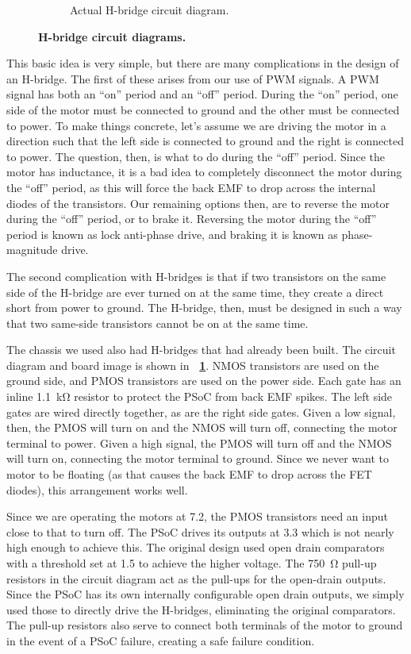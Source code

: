 \documentclass[letterpaper, 11pt]{article}
\newcommand*{\figref}[1]{\textbf{\figurename~\ref{#1}}}
\begin{document}
\begin{enumerate}[label=\textbf{\arabic*.}]
\begin{figure}[ht]
\begin{subfigure}[t]{0.66\textwidth}
        \caption{Actual H-bridge circuit diagram.}
        \label{fig:hb-circuit}
    \end{subfigure}
    \caption{\textbf{H-bridge circuit diagrams.}}
    \label{fig:hbridge}
\end{figure}

This basic idea is very simple, but there are many complications in the design of an H-bridge. The first of these arises from our use of PWM signals. A PWM signal has both an ``on'' period and an ``off'' period. During the ``on'' period, one side of the motor must be connected to ground and the other must be connected to power. To make things concrete, let's assume we are driving the motor in a direction such that the left side is connected to ground and the right is connected to power. The question, then, is what to do during the ``off'' period. Since the motor has inductance, it is a bad idea to completely disconnect the motor during the ``off'' period, as this will force the back EMF to drop across the internal diodes of the transistors. Our remaining options then, are to reverse the motor during the ``off'' period, or to brake it. Reversing the motor during the ``off'' period is known as lock anti-phase drive, and braking it is known as phase-magnitude drive.

The second complication with H-bridges is that if two transistors on the same side of the H-bridge are ever turned on at the same time, they create a direct short from power to ground. The H-bridge, then, must be designed in such a way that two same-side transistors cannot be on at the same time.

The chassis we used also had H-bridges that had already been built. The circuit diagram and board image is shown in \figref{fig:hb-circuit}. NMOS transistors are used on the ground side, and PMOS transistors are used on the power side. Each gate has an inline \SI{1.1}{\kilo\ohm} resistor to protect the PSoC from back EMF spikes. The left side gates are wired directly together, as are the right side gates. Given a low signal, then, the PMOS will turn on and the NMOS will turn off, connecting the motor terminal to power. Given a high signal, the PMOS will turn off and the NMOS will turn on, connecting the motor terminal to ground. Since we never want to motor to be floating (as that causes the back EMF to drop across the FET diodes), this arrangement works well.

Since we are operating the motors at \SI{7.2}{\volts}, the PMOS transistors need an input close to that to turn off. The PSoC drives its outputs at \SI{3.3}{\volts} which is not nearly high enough to achieve this. The original design used open drain comparators with a threshold set at \SI{1.5}{\volts} to achieve the higher voltage. The \SI{750}{\ohm} pull-up resistors in the circuit diagram act as the pull-ups for the open-drain outputs. Since the PSoC has its own internally configurable open drain outputs, we simply used those to directly drive the H-bridges, eliminating the original comparators. The pull-up resistors also serve to connect both terminals of the motor to ground in the event of a PSoC failure, creating a safe failure condition.


\end{enumerate}
\end{document}
